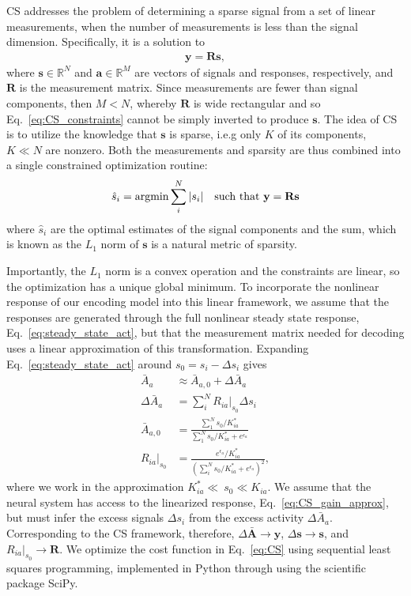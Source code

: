 CS addresses the problem of determining a sparse signal from a set of linear measurements, when the number of measurements is less than the signal dimension. Specifically, it is a solution to 
\begin{align}
\mathbf y = \mathbf R\mathbf s,
\label{eq:CS_constraints}
\end{align} where $\mathbf s \in \mathbb{R}^N$ and $\mathbf a\in \mathbb{R}^M$ are vectors of signals and responses, respectively, and $\mathbf R$ is the measurement matrix. Since measurements are fewer than signal components, then $M < N$, whereby $\mathbf R$ is wide rectangular and so Eq.~\ref{eq:CS_constraints} cannot be simply inverted to produce $\mathbf s$. The idea of CS is to utilize the knowledge that $\mathbf s$ is sparse, i.e.g only $K$ of its components, $K \ll N$ are nonzero. Both the measurements and sparsity are thus combined into a single constrained optimization routine:
\begin{align}
\hat s_i = \textup{argmin} \sum_i^N |s_i| \quad \textup{such that } \mathbf y = \mathbf R\mathbf s
\label{eq:CS}
\end{align}
where $\hat s_i$ are the optimal estimates of the signal components and the sum, which is known as the $L_1$ norm of $\mathbf s$ is a natural metric of sparsity. 

Importantly, the $L_1$ norm is a convex operation and the constraints are linear, so the optimization has a unique global minimum. To incorporate the nonlinear response of our encoding model into this linear framework, we assume that the responses are generated through the full nonlinear steady state response, Eq.~\ref{eq:steady_state_act}, but that the measurement matrix needed for decoding uses a linear approximation of this transformation.  Expanding Eq.~\ref{eq:steady_state_act} around $s_0 = s_i - \Delta s_i$ gives
\begin{align}
\bar A_a &\approx \bar A_{a, 0} + \Delta \bar{A}_a \label{eq:CS_act_approx} \\
\Delta \bar{A}_a &= \sum_i^NR_{ia}\big|_{s_0}\Delta s_i \label{eq:CS_dAct_approx}\\
\bar A_{a, 0} &= \frac{\sum_1^N s_0/K_{ia}^*}{\sum_1^N s_0/K_{ia}^* + e^{\epsilon_a}} \label{eq:CS_act0_approx} \\
R_{ia}\big|_{s_0} &=  \frac{e^{\epsilon_a}/K_{ia}^*}{(\sum_i^Ns_0/K_{ia}^* + e^{\epsilon_a})^2},
\label{eq:CS_gain_approx}
\end{align}
where we work in the approximation $K^*_{ia} \ll~s_0 \ll K_{ia}$. We assume that the neural system has access to the linearized response, Eq.~\ref{eq:CS_gain_approx}, but must infer the excess signals $\Delta s_i$ from the excess activity $\Delta \bar A_a$. Corresponding to the CS framework, therefore, $\Delta \mathbf {\bar A} \rightarrow \mathbf y$, $\Delta \mathbf s \rightarrow \mathbf s$, and $R_{ia}\big|_{s_0} \rightarrow \mathbf R$. We optimize the cost function in Eq.~\ref{eq:CS} using sequential least squares programming, implemented in Python through using the scientific package SciPy.

